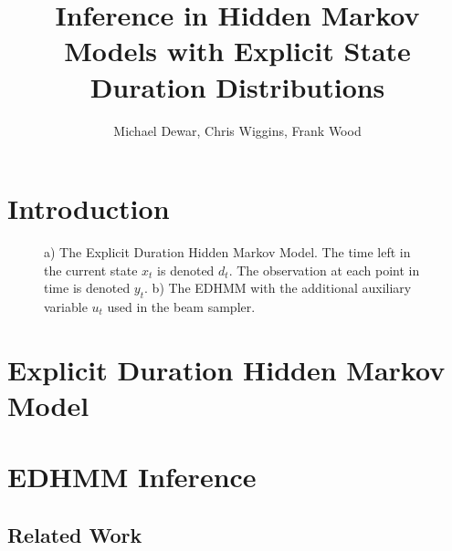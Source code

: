 \documentclass[journal]{../inc/oldtran/IEEEtran}
\title{Inference in Hidden Markov Models with Explicit State Duration Distributions}
\author{Michael Dewar, Chris Wiggins, Frank Wood}
\begin{document}
    
\maketitle

\begin{abstract}

\end{abstract}

\section{Introduction}



    \begin{figure}[t]
        \centering
        \caption{a) The Explicit Duration Hidden Markov Model. The time left in the current state $x_t$ is denoted $d_t$. The observation at each point in time is denoted $y_t$. b) The EDHMM with the additional auxiliary variable $u_t$ used in the beam sampler.}
    \label{fig:graphs}    
    \end{figure}
\section{Explicit Duration Hidden Markov Model}
\label{sec:Model}





\section{EDHMM Inference}

\label{sec:inference}




\subsection{Related Work}
\end{document}
